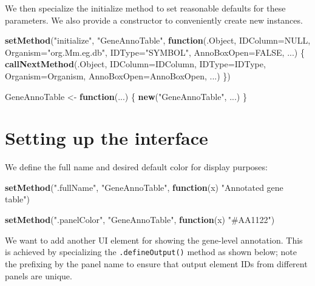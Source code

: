 \documentclass[
]{book}
\newenvironment{Shaded}{\begin{snugshade}}{\end{snugshade}}
\newcommand{\ControlFlowTok}[1]{\textcolor[rgb]{0.13,0.29,0.53}{\textbf{#1}}}
\newcommand{\DataTypeTok}[1]{\textcolor[rgb]{0.13,0.29,0.53}{#1}}
\newcommand{\KeywordTok}[1]{\textcolor[rgb]{0.13,0.29,0.53}{\textbf{#1}}}
\newcommand{\NormalTok}[1]{#1}
\newcommand{\OtherTok}[1]{\textcolor[rgb]{0.56,0.35,0.01}{#1}}
\newcommand{\StringTok}[1]{\textcolor[rgb]{0.31,0.60,0.02}{#1}}
\begin{document}
We then specialize the initialize method to set reasonable defaults for these parameters.
We also provide a constructor to conveniently create new instances.

\begin{Shaded}
\begin{Highlighting}[]
\KeywordTok{setMethod}\NormalTok{(}\StringTok{"initialize"}\NormalTok{, }\StringTok{"GeneAnnoTable"}\NormalTok{, }\ControlFlowTok{function}\NormalTok{(.Object, }\DataTypeTok{IDColumn=}\OtherTok{NULL}\NormalTok{, }
    \DataTypeTok{Organism=}\StringTok{"org.Mm.eg.db"}\NormalTok{, }\DataTypeTok{IDType=}\StringTok{"SYMBOL"}\NormalTok{, }\DataTypeTok{AnnoBoxOpen=}\OtherTok{FALSE}\NormalTok{, ...)}
\NormalTok{\{}
    \KeywordTok{callNextMethod}\NormalTok{(.Object, }\DataTypeTok{IDColumn=}\NormalTok{IDColumn, }\DataTypeTok{IDType=}\NormalTok{IDType,}
        \DataTypeTok{Organism=}\NormalTok{Organism, }\DataTypeTok{AnnoBoxOpen=}\NormalTok{AnnoBoxOpen, ...)}
\NormalTok{\})}

\NormalTok{GeneAnnoTable <-}\StringTok{ }\ControlFlowTok{function}\NormalTok{(...) \{}
    \KeywordTok{new}\NormalTok{(}\StringTok{"GeneAnnoTable"}\NormalTok{, ...)}
\NormalTok{\}}
\end{Highlighting}
\end{Shaded}

\hypertarget{setting-up-the-interface}{%
\section{Setting up the interface}\label{setting-up-the-interface}}

We define the full name and desired default color for display purposes:

\begin{Shaded}
\begin{Highlighting}[]
\KeywordTok{setMethod}\NormalTok{(}\StringTok{".fullName"}\NormalTok{, }\StringTok{"GeneAnnoTable"}\NormalTok{, }\ControlFlowTok{function}\NormalTok{(x) }\StringTok{"Annotated gene table"}\NormalTok{)}

\KeywordTok{setMethod}\NormalTok{(}\StringTok{".panelColor"}\NormalTok{, }\StringTok{"GeneAnnoTable"}\NormalTok{, }\ControlFlowTok{function}\NormalTok{(x) }\StringTok{"#AA1122"}\NormalTok{)}
\end{Highlighting}
\end{Shaded}

We want to add another UI element for showing the gene-level annotation.
This is achieved by specializing the \texttt{.defineOutput()} method as shown below;
note the prefixing by the panel name to ensure that output element IDs from different panels are unique.
\end{document}
